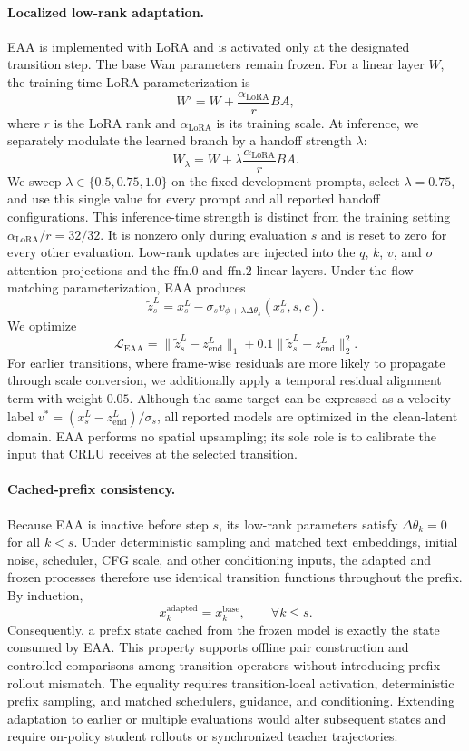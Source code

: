 \paragraph{Localized low-rank adaptation.}
EAA is implemented with LoRA \citep{hu2022lora} and is activated only at the
designated transition step. The base Wan parameters remain frozen. For a
linear layer \(W\), the training-time LoRA parameterization is
\[
W'=W+\frac{\alpha_{\mathrm{LoRA}}}{r}BA,
\]
where \(r\) is the LoRA rank and \(\alpha_{\mathrm{LoRA}}\) is its training
scale. At inference, we separately modulate the learned branch by a handoff
strength \(\lambda\):
\[
W_{\lambda}=W+\lambda\frac{\alpha_{\mathrm{LoRA}}}{r}BA.
\]
We sweep \(\lambda\in\{0.5,0.75,1.0\}\) on the fixed development prompts,
select \(\lambda=0.75\), and use this single value for every prompt and all
reported handoff configurations. This inference-time strength is distinct from
the training setting \(\alpha_{\mathrm{LoRA}}/r=32/32\). It is nonzero only
during evaluation \(s\) and is reset to zero for every other evaluation.
Low-rank updates are injected into the
\(q\), \(k\), \(v\), and \(o\) attention projections and the
\(\mathrm{ffn}.0\) and \(\mathrm{ffn}.2\) linear layers. Under the
flow-matching parameterization, EAA produces
\[
\widetilde z_s^L
=x_s^L-\sigma_s
v_{\phi+\lambda\Delta\theta_s}(x_s^L,s,c).
\]
We optimize
\[
\mathcal L_{\mathrm{EAA}}
=
\lVert\widetilde z_s^L-z_{\mathrm{end}}^L\rVert_1
+0.1\lVert\widetilde z_s^L-z_{\mathrm{end}}^L\rVert_2^2.
\]
For earlier transitions, where frame-wise residuals are more likely to
propagate through scale conversion, we additionally apply a temporal residual
alignment term with weight \(0.05\). Although the same target can be expressed
as a velocity label
\(v^*=(x_s^L-z_{\mathrm{end}}^L)/\sigma_s\), all reported models are optimized
in the clean-latent domain. EAA performs no spatial upsampling; its sole role is
to calibrate the input that CRLU receives at the selected transition.

\paragraph{Cached-prefix consistency.}
\label{sec:cached}
Because EAA is inactive before step \(s\), its low-rank parameters satisfy
\(\Delta\theta_k=0\) for all \(k<s\). Under deterministic sampling and
matched text embeddings, initial noise, scheduler, CFG scale, and other
conditioning inputs, the adapted and frozen processes therefore use identical
transition functions throughout the prefix. By induction,
\[
x_k^{\mathrm{adapted}}=x_k^{\mathrm{base}},
\qquad \forall k\leq s.
\]
Consequently, a prefix state cached from the frozen model is exactly the state
consumed by EAA. This property supports offline pair construction and
controlled comparisons among transition operators without introducing prefix
rollout mismatch. The equality requires transition-local activation,
deterministic prefix sampling, and matched schedulers, guidance, and
conditioning. Extending adaptation to earlier or multiple evaluations would
alter subsequent states and require on-policy student rollouts or synchronized
teacher trajectories.

